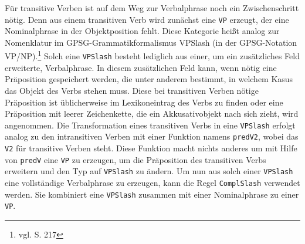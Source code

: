 \documentclass[fontsize=12pt,abstract=on,titlepage,bibliography=totoc,ngerman,listof=totoc]{scrreprt}
\begin{document}
Für transitive Verben ist auf dem Weg zur Verbalphrase noch ein Zwischenschritt nötig. Denn aus einem transitiven Verb wird zunächst eine \texttt{VP} erzeugt, der eine Nominalphrase in der Objektposition fehlt. Diese Kategorie heißt analog zur Nomenklatur im GPSG-Grammatikformalismus VPSlash (in der GPSG-Notation VP/NP).\footnote{vgl. \cite{RANTA2011} S. 217} Solch eine \texttt{VPSlash} besteht lediglich aus einer, um ein zusätzliches Feld erweiterte, Verbalphrase. In diesem zusätzlichen Feld kann, wenn nötig eine Präposition gespeichert werden, die unter anderem bestimmt, in welchem Kasus das Objekt des Verbs stehen muss. Diese bei transitiven Verben nötige Präposition ist üblicherweise im Lexikoneintrag des Verbs zu finden oder eine Präposition mit leerer Zeichenkette, die ein Akkusativobjekt nach sich zieht, wird angenommen. Die Transformation eines transitiven Verbs in eine \texttt{VPSlash} erfolgt analog zu den intransitiven Verben mit einer Funktion namens \texttt{predV2}, wobei das \texttt{V2} für transitive Verben steht. Diese Funktion macht nichts anderes um mit Hilfe von \texttt{predV} eine \texttt{VP} zu erzeugen, um die Präposition des transitiven Verbs erweitern und den Typ auf \texttt{VPSlash} zu ändern. Um nun aus solch einer \texttt{VPSlash} eine vollständige Verbalphrase zu erzeugen, kann die Regel \texttt{ComplSlash} verwendet werden. Sie kombiniert eine \texttt{VPSlash} zusammen mit einer Nominalphrase zu einer \texttt{VP}.
\FloatBarrier
\end{document}
